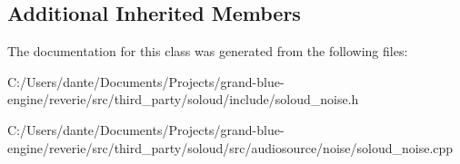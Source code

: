 \subsection*{Additional Inherited Members}


The documentation for this class was generated from the following files\+:\begin{DoxyCompactItemize}
\item 
C\+:/\+Users/dante/\+Documents/\+Projects/grand-\/blue-\/engine/reverie/src/third\+\_\+party/soloud/include/soloud\+\_\+noise.\+h\item 
C\+:/\+Users/dante/\+Documents/\+Projects/grand-\/blue-\/engine/reverie/src/third\+\_\+party/soloud/src/audiosource/noise/soloud\+\_\+noise.\+cpp\end{DoxyCompactItemize}
